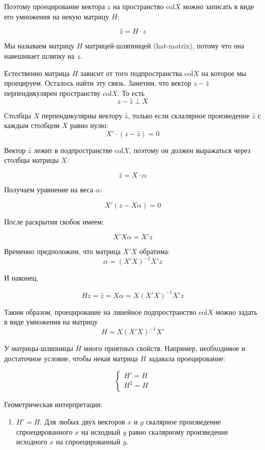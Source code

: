 \documentclass[11pt,russian,]{article}
\providecommand{\tightlist}{%
  \setlength{\itemsep}{0pt}\setlength{\parskip}{0pt}}
\newcommand{\1}{\mathbbm{1}}
\newcommand{\col}{\mathcal{col}}
\renewcommand{\col}{\mathrm{col}}
\begin{document}
Поэтому проецирование вектора \(z\) на пространство \(\col X\) можно
записать в виде его умножения на некую матрицу \(H\):

\[
\hat z = H \cdot z
\]

Мы называем матрицу \(H\) матрицей-шляпницей (hat-matrix), потому что
она навешивает шляпку на \(z\).

Естественно матрица \(H\) зависит от того подпространства \(\col X\) на
которое мы проецируем. Осталось найти эту связь. Заметим, что вектор
\(z - \hat z\) перпендикулярен пространству \(\col X\). То есть \[
z - \hat z \perp X
\]

Столбцы \(X\) перпендикулярны вектору \(\hat z\), только если склалярное
произведение \(\hat z\) с каждым столбцом \(X\) равно нулю: \[
X' \cdot (z - \hat z) = 0
\]

Вектор \(\hat z\) лежит в подпространстве \(\col X\), поэтому он должен
выражаться через столбцы матрицы \(X\):

\[
\hat z = X\cdot \alpha
\]

Получаем уравнение на веса \(\alpha\):

\[
X' (z - X\alpha)=0
\]

После раскрытия скобок имеем:

\[
X'X\alpha = X'z
\]

Временно предположим, что матрица \(X'X\) обратима: \[
\alpha = (X'X)^{-1}X'z
\]

И наконец,

\[
Hz = \hat z = X\alpha = X(X'X)^{-1}X'z
\]

Таким образом, проецирование на линейное подпространство \(\col X\)
можно задать в виде умножения на матрицу \[
H=X(X'X)^{-1}X'
\]

У матрицы-шляпницы \(H\) много приятных свойств. Например, необходимое и
достаточное условие, чтобы некая матрица \(H\) задавала проецирование:

\[
\begin{cases}
H' = H \\
H^2 = H \\
\end{cases}
\]

Геометрическая интерпретация:

\begin{enumerate}
\def\labelenumi{\arabic{enumi}.}
\tightlist
\item
  \(H'=H\). Для любых двух векторов \(x\) и \(y\) скалярное произведение
  спроецированного \(x\) на исходный \(y\) равно скалярному произведение
  исходного \(x\) на спроецированный \(y\).
\end{enumerate}
\end{document}
